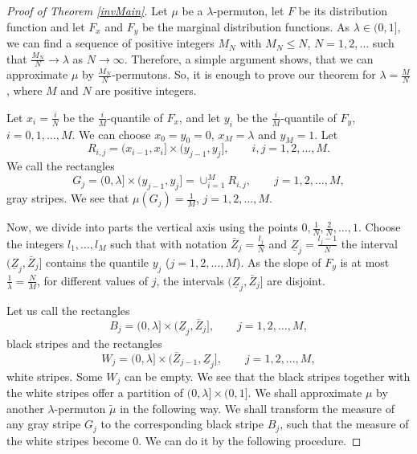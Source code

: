 \documentclass[12pt,twoside]{article}
\theoremstyle{definition}
\theoremstyle{remark}
\numberwithin{equation}{section}
\theoremstyle{plain}
\theoremstyle{remark}
\begin{document}
%
\begin{proof}[Proof of Theorem \ref{invMain}]
Let $\mu$ be a $\lambda$-permuton, let $F$ be its distribution function and let $F_x$ and $F_y$ be the marginal
distribution functions.
As $\lambda \in (0, 1]$, we can find a sequence of positive integers $M_N$ with $M_N \le N$,  $N= 1, 2, \dots $
such that $\frac{M_N}{N} \to \lambda$ as $N \to \infty$.
Therefore, a simple argument shows, that we can approximate $\mu$ by $\frac{M_N}{N}$-permutons.
So, it is enough to prove our theorem for $\lambda= \frac{M}{N}$, where $M$ and $N$ are positive integers.

Let $x_i= \frac{i}{N}$ be the $\frac{i}{M}$-quantile of $F_x$, and let $y_i$ be the $\frac{i}{M}$-quantile of $F_y$, $i=0,1, \dots, M$.
We can choose $x_0=y_0= 0$, $x_M= \lambda$ and  $y_M= 1$.
Let
$$
R_{i,j} = (x_{i-1}, x_i] \times (y_{j-1}, y_j], \qquad i,j= 1,2,\dots , M.
$$
We call the rectangles
$$
G_{j} = (0, \lambda] \times (y_{j-1}, y_j] = \cup_{i=1}^M R_{i,j}, \qquad j= 1,2,\dots , M,
$$
gray stripes.
We see that $\mu(G_j) = \frac{1}{M}$, $j= 1,2,\dots , M$.

Now, we divide into parts the vertical axis using the points $0, \frac{1}{N}, \frac{2}{N}, \dots, 1$.
Choose the integers $l_1, \dots , l_M$ such that with notation
$\bar{Z}_j= \frac{l_j}{N}$ and $\underline{Z}_j= \frac{l_j-1}{N}$
the interval $( \underline{Z}_j , \bar{Z}_j]$ contains the quantile $y_j$ ($j= 1,2,\dots , M$).
As the slope of $F_y$ is at most $\frac{1}{\lambda} = \frac{N}{M}$, for different values of $j$, 
the intervals $( \underline{Z}_j , \bar{Z}_j]$ are disjoint.

Let us call the rectangles
$$
B_{j} = (0, \lambda] \times ( \underline{Z}_j , \bar{Z}_j] , \qquad j= 1,2,\dots , M,
$$
black stripes and the rectangles
$$
W_{j} = (0, \lambda] \times ( \bar{Z}_{j-1}, \underline{Z}_j] , \qquad j= 1,2,\dots , M,
$$
white stripes.
Some $W_j$ can be empty.
We see that the black stripes together with the white stripes offer a partition of $(0,\lambda]\times(0,1]$.
We shall approximate $\mu$ by another $\lambda$-permuton $\tilde{\mu}$ in the following way.
We shall transform the measure of any gray stripe $G_j$ to the corresponding black stripe $B_j$, such that
the measure of the white stripes become $0$.
We can do it by the following procedure.


\end{proof}
\end{document}
